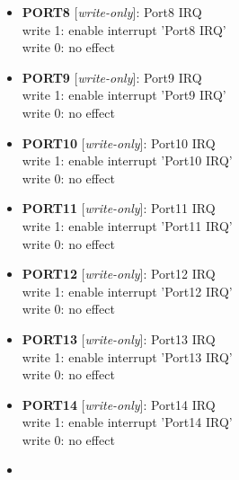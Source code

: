 \begin{itemize}
\begin{small}
write 1: enable interrupt 'Port7 IRQ'\\write 0: no effect
\end{small}
\item \begin{small}
{\bf 
PORT8
} [\emph{write-only}]: Port8 IRQ
\\
write 1: enable interrupt 'Port8 IRQ'\\write 0: no effect
\end{small}
\item \begin{small}
{\bf 
PORT9
} [\emph{write-only}]: Port9 IRQ
\\
write 1: enable interrupt 'Port9 IRQ'\\write 0: no effect
\end{small}
\item \begin{small}
{\bf 
PORT10
} [\emph{write-only}]: Port10 IRQ
\\
write 1: enable interrupt 'Port10 IRQ'\\write 0: no effect
\end{small}
\item \begin{small}
{\bf 
PORT11
} [\emph{write-only}]: Port11 IRQ
\\
write 1: enable interrupt 'Port11 IRQ'\\write 0: no effect
\end{small}
\item \begin{small}
{\bf 
PORT12
} [\emph{write-only}]: Port12 IRQ
\\
write 1: enable interrupt 'Port12 IRQ'\\write 0: no effect
\end{small}
\item \begin{small}
{\bf 
PORT13
} [\emph{write-only}]: Port13 IRQ
\\
write 1: enable interrupt 'Port13 IRQ'\\write 0: no effect
\end{small}
\item \begin{small}
{\bf 
PORT14
} [\emph{write-only}]: Port14 IRQ
\\
write 1: enable interrupt 'Port14 IRQ'\\write 0: no effect
\end{small}
\item \begin{small}

\end{small}
\end{itemize}
